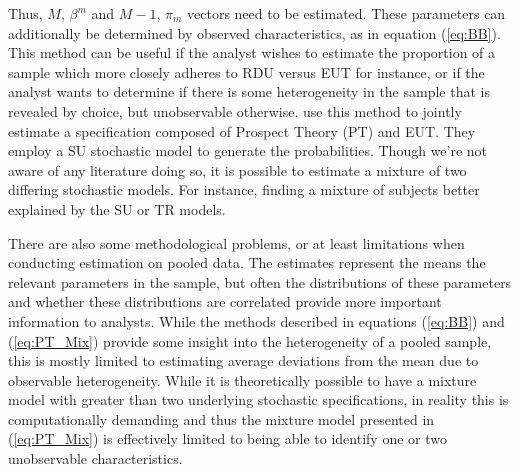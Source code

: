 \documentclass[../main.tex]{subfiles}
\begin{document}
Thus, $M$, $\beta^m$ and $M-1$, $\pi_m$ vectors need to be estimated.
These parameters can additionally be determined by observed characteristics, as in equation (\ref{eq:BB}).
This method can be useful if the analyst wishes to estimate the proportion of a sample which more closely adheres to RDU versus EUT for instance, or if the analyst wants to determine if there is some heterogeneity in the sample that is revealed by choice, but unobservable otherwise.
\textcite[141]{Harrison2008a} use this method to jointly estimate a specification composed of Prospect Theory (PT) and EUT.
They employ a SU stochastic model to generate the probabilities.
Though we're not aware of any literature doing so, it is possible to estimate a mixture of two differing stochastic models.
For instance, finding a mixture of subjects better explained by the SU or TR models.{\footnotemark}

\addtocounter{footnote}{-1}
 
There are also some methodological problems, or at least limitations when conducting estimation on pooled data.
The estimates represent the means the relevant parameters in the sample, but often the distributions of these parameters and whether these distributions are correlated provide more important information to analysts.{\footnotemark} 
While the methods described in equations (\ref{eq:BB}) and (\ref{eq:PT_Mix}) provide some insight into the heterogeneity of a pooled sample, this is mostly limited to estimating average deviations from the mean due to observable heterogeneity.
While it is theoretically possible to have a mixture model with greater than two underlying stochastic specifications, in reality this is computationally demanding and thus the mixture model presented in (\ref{eq:PT_Mix}) is effectively limited to being able to identify one or two unobservable characteristics.

\addtocounter{footnote}{-1}
\end{document}
